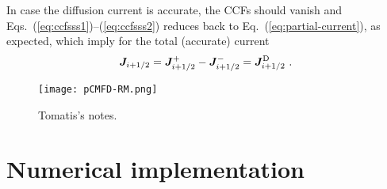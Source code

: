 \documentclass[]{article}
\newcommand{\eq}[1]{Eq.~(\ref{#1})}
\newcommand{\eqsthru}[2]{Eqs.~(\ref{#1})--(\ref{#2})}
\newcommand{\jp}{\ensuremath{\bm{J}^+}}
\newcommand{\jm}{\ensuremath{\bm{J}^-}}
\newcommand{\jD}{\ensuremath{\bm{J}^{\textrm{\scriptsize{D}}}}}
\begin{document}
In case the diffusion current is accurate, the CCFs should vanish and \eqsthru{eq:ccfsss1}{eq:ccfsss2} reduces back to \eq{eq:partial-current}, as expected, which imply for the total (accurate) current 
\begin{equation}
\bm{J} _{i+1/2} = \jp _{i+1/2} - \jm _{i+1/2} = \jD _{i+1/2} \,\, .
\end{equation} 
  

\begin{figure}[htbp]
	\centering
	\texttt{[image: pCMFD-RM.png]}
	\caption{Tomatis's notes.}
	\label{fig:Tnotes}
\end{figure}


\section{Numerical implementation}


 
\end{document}
